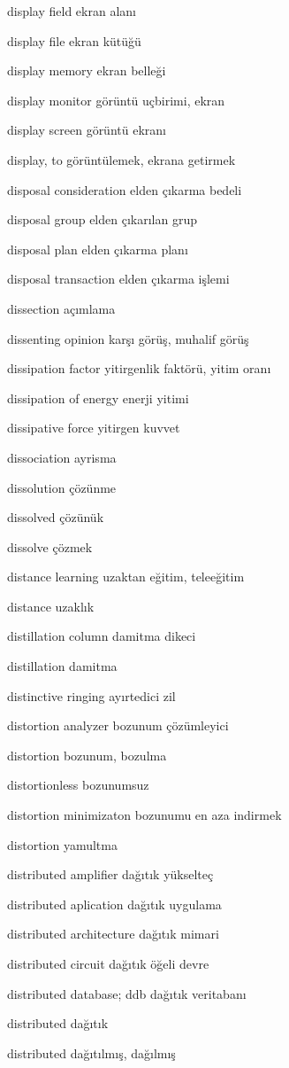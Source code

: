 \documentclass[12pt,fleqn]{article}\usepackage{../../common}
\begin{document}
display field ekran alanı

display file ekran kütüğü

display memory ekran belleği

display monitor görüntü uçbirimi, ekran

display screen görüntü ekranı

display, to görüntülemek, ekrana getirmek

disposal consideration elden çıkarma bedeli

disposal group elden çıkarılan grup

disposal plan elden çıkarma planı

disposal transaction elden çıkarma işlemi

dissection açımlama

dissenting opinion karşı görüş, muhalif görüş

dissipation factor yitirgenlik faktörü, yitim oranı

dissipation of energy enerji yitimi

dissipative force yitirgen kuvvet

dissociation ayrisma

dissolution çözünme

dissolved çözünük

dissolve çözmek

distance learning uzaktan eğitim, teleeğitim

distance uzaklık

distillation column damitma dikeci

distillation damitma

distinctive ringing ayırtedici zil

distortion analyzer bozunum çözümleyici

distortion bozunum, bozulma

distortionless bozunumsuz

distortion minimizaton bozunumu en aza indirmek

distortion yamultma

distributed amplifier dağıtık yükselteç

distributed aplication dağıtık uygulama

distributed architecture dağıtık mimari

distributed circuit dağıtık öğeli devre

distributed database; ddb dağıtık veritabanı

distributed dağıtık

distributed dağıtılmış, dağılmış
\end{document}
